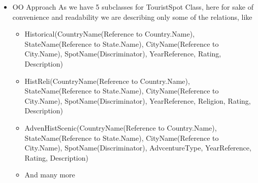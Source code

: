 \documentclass[11pt]{article}
\begin{document}
\begin{itemize}
\begin{itemize}
\begin{itemize}
\end{itemize}
\item OO Approach \newline
As we have 5 subclasses for TouristSpot Class, here for sake of convenience and readability we are describing only some of the relations, like
\begin{itemize}
\item Historical(CountryName(Reference to Country.Name), StateName(Reference to State.Name), CityName(Reference to City.Name), SpotName(Discriminator), YearReference, Rating, Description)
\item HistReli(CountryName(Reference to Country.Name), StateName(Reference to State.Name), CityName(Reference to City.Name), SpotName(Discriminator), YearReference, Religion, Rating, Description)
\item AdvenHistScenic(CountryName(Reference to Country.Name), StateName(Reference to State.Name), CityName(Reference to City.Name), SpotName(Discriminator), AdvcentureType, YearReference, Rating, Description)
\item And many more
\end{itemize}
\end{itemize}
\end{itemize}
\end{document}
